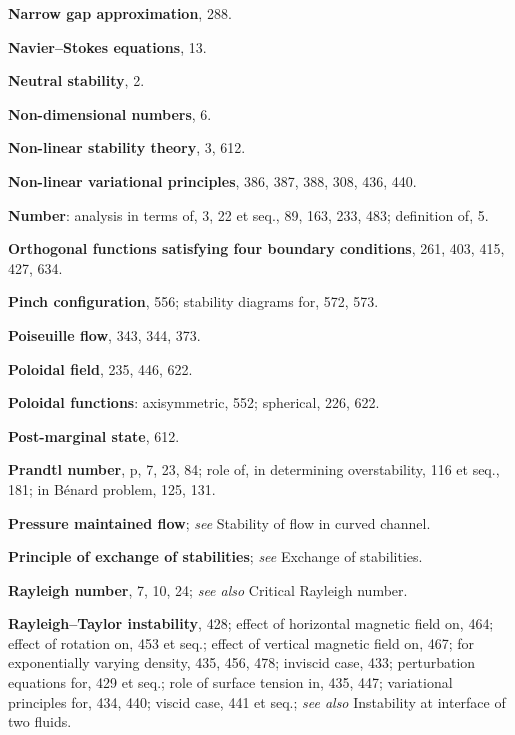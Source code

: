 \begin{small}
\bigskip\noindent
\textbf{Narrow gap approximation}, 288.

\medskip\noindent
\textbf{Navier--Stokes equations}, 13.

\medskip\noindent
\textbf{Neutral stability}, 2.

\medskip\noindent
\textbf{Non-dimensional numbers}, 6.

\medskip\noindent
\textbf{Non-linear stability theory}, 3, 612.

\medskip\noindent
\textbf{Non-linear variational principles}, 386, 387,
  388, 308, 436, 440.

\medskip\noindent
\textbf{Number}:
  analysis in terms of, 3, 22 et seq., 89, 163,
    233, 483;
  definition of, 5.

\bigskip\noindent
\textbf{Orthogonal functions satisfying four boundary conditions}, 261, 403, 415, 427, 634.

\bigskip\noindent
\textbf{Pinch configuration}, 556;
  stability diagrams for, 572, 573.

\medskip\noindent
\textbf{Poiseuille flow}, 343, 344, 373.

\medskip\noindent
\textbf{Poloidal field}, 235, 446, 622.

\medskip\noindent
\textbf{Poloidal functions}:
  axisymmetric, 552;
  spherical, 226, 622.

\medskip\noindent
\textbf{Post-marginal state}, 612.

\medskip\noindent
\textbf{Prandtl number}, p, 7, 23, 84;
  role of, in determining overstability, 116
    et seq., 181;
  in B\'enard problem, 125, 131.

\medskip\noindent
\textbf{Pressure maintained flow}; \textit{see} Stability of
  flow in curved channel.

\medskip\noindent
\textbf{Principle of exchange of stabilities}; \textit{see}
  Exchange of stabilities.

\bigskip\noindent
\textbf{Rayleigh number}, 7, 10, 24;
  \textit{see also} Critical Rayleigh number.

\medskip\noindent
\textbf{Rayleigh--Taylor instability}, 428;
  effect of horizontal magnetic field on, 464;
  effect of rotation on, 453 et seq.;
  effect of vertical magnetic field on, 467;
  for exponentially varying density, 435,
    456, 478;
  inviscid case, 433;
  perturbation equations for, 429 et seq.;
  role of surface tension in, 435, 447;
  variational principles for, 434, 440;
  viscid case, 441 et seq.;
  \textit{see also} Instability at interface of two
    fluids.


\end{small}
